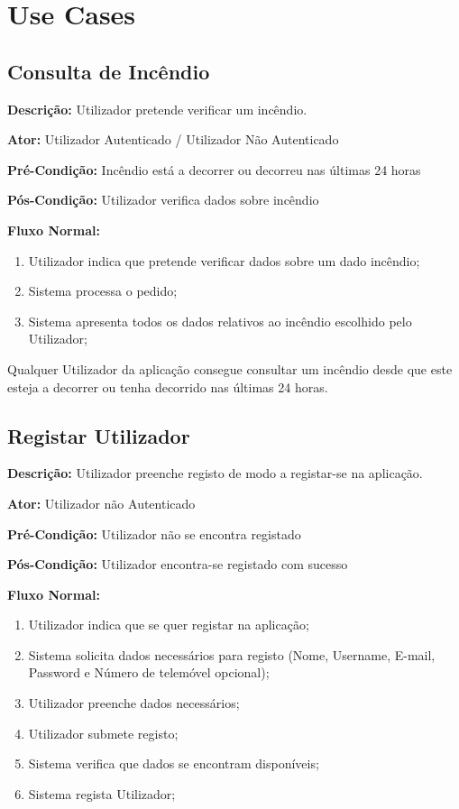 \documentclass[a4paper,12pt]{scrreprt}
\newcommand{\tab}{
    \hspace{1cm}}
\begin{document}
\clearpage
\chapter{Use Cases}

\section{Consulta de Incêndio}

\textbf{Descrição: }Utilizador pretende verificar um incêndio.

\textbf{Ator: }Utilizador Autenticado / Utilizador Não Autenticado

\textbf{Pré-Condição: }Incêndio está a decorrer ou decorreu nas últimas 24 horas

\textbf{Pós-Condição: }Utilizador verifica dados sobre incêndio

\textbf{Fluxo Normal: }
\begin{enumerate}
    \item Utilizador indica que pretende verificar dados sobre um dado incêndio;
    \item Sistema processa o pedido;
    \item Sistema apresenta todos os dados relativos ao incêndio escolhido pelo Utilizador;
\end{enumerate}

\vspace{1.5cm}

\tab Qualquer Utilizador da aplicação consegue consultar um incêndio desde que este esteja a decorrer ou tenha decorrido nas últimas 24 horas.

\clearpage

\section{Registar Utilizador}

\textbf{Descrição: }Utilizador preenche registo de modo a registar-se na aplicação.

\textbf{Ator: }Utilizador não Autenticado

\textbf{Pré-Condição: }Utilizador não se encontra registado

\textbf{Pós-Condição: }Utilizador encontra-se registado com sucesso

\textbf{Fluxo Normal: }
\begin{enumerate}
    \item Utilizador indica que se quer registar na aplicação;
    \item Sistema solicita dados necessários para registo (Nome, Username, E-mail, Password e Número de telemóvel opcional);
    \item Utilizador preenche dados necessários;
    \item Utilizador submete registo;
    \item Sistema verifica que dados se encontram disponíveis;
    \item Sistema regista Utilizador;
\end{enumerate}
\end{document}
